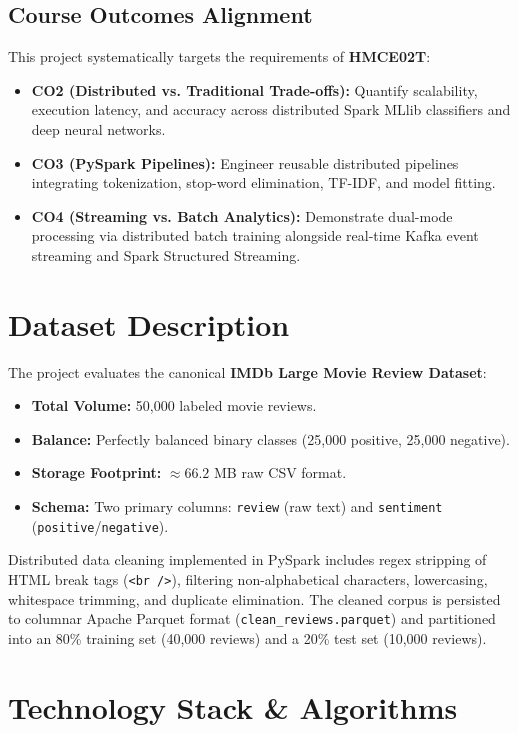 \documentclass[conference]{IEEEtran}
\begin{document}
\subsection{Course Outcomes Alignment}
This project systematically targets the requirements of \textbf{HMCE02T}:
\begin{itemize}
    \item \textbf{CO2 (Distributed vs. Traditional Trade-offs):} Quantify scalability, execution latency, and accuracy across distributed Spark MLlib classifiers and deep neural networks.
    \item \textbf{CO3 (PySpark Pipelines):} Engineer reusable distributed pipelines integrating tokenization, stop-word elimination, TF-IDF, and model fitting.
    \item \textbf{CO4 (Streaming vs. Batch Analytics):} Demonstrate dual-mode processing via distributed batch training alongside real-time Kafka event streaming and Spark Structured Streaming.
\end{itemize}

\section{Dataset Description}
The project evaluates the canonical \textbf{IMDb Large Movie Review Dataset}:
\begin{itemize}
    \item \textbf{Total Volume:} 50,000 labeled movie reviews.
    \item \textbf{Balance:} Perfectly balanced binary classes (25,000 positive, 25,000 negative).
    \item \textbf{Storage Footprint:} $\approx 66.2$ MB raw CSV format.
    \item \textbf{Schema:} Two primary columns: \texttt{review} (raw text) and \texttt{sentiment} (\texttt{positive}/\texttt{negative}).
\end{itemize}
Distributed data cleaning implemented in PySpark includes regex stripping of HTML break tags (\texttt{<br />}), filtering non-alphabetical characters, lowercasing, whitespace trimming, and duplicate elimination. The cleaned corpus is persisted to columnar Apache Parquet format (\texttt{clean\_reviews.parquet}) and partitioned into an 80\% training set (40,000 reviews) and a 20\% test set (10,000 reviews).

\section{Technology Stack \& Algorithms}
\end{document}
